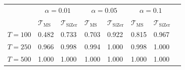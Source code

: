 \documentclass[12pt]{article}
\begin{document}
\begin{table}[t!]
{\begin{subtable}[b]{\textwidth}
\vspace{0.25cm} 
\begin{tabularx}{\textwidth}{l@{\hskip 20pt} Z@{\hskip 6pt}Z@{\hskip 20pt}Z@{\hskip 6pt}Z@{\hskip 6pt}Z@{\hskip 6pt}Z@{\hskip 20pt}Z}
\toprule
 &  &  & \\
 & $\mathcal{T}_{\text{MS}}$ & $\mathcal{T}_{\text{SiZer}}$   & $\mathcal{T}_{\text{MS}}$ & $\mathcal{T}_{\text{SiZer}}$ & $\mathcal{T}_{\text{MS}}$ & $\mathcal{T}_{\text{SiZer}}$\\
$T = 100$ & 0.482 & 0.733 & 0.703 & 0.922 & 0.815 & 0.967 \\ 
  $T = 250$ & 0.966 & 0.998 & 0.994 & 1.000 & 0.998 & 1.000 \\ 
  $T = 500$ & 1.000 & 1.000 & 1.000 & 1.000 & 1.000 & 1.000 \\ 
\bottomrule
\end{tabularx}
\end{subtable}}
\end{table}
\end{document}
